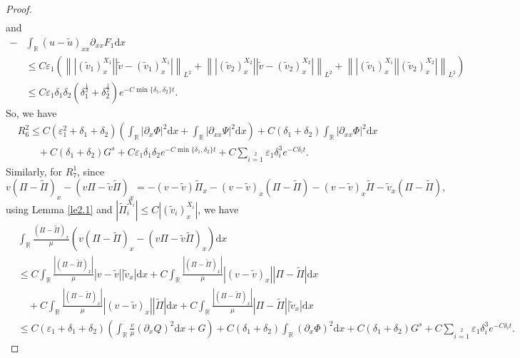\documentclass[10pt,reqno]{amsart}
\numberwithin{equation}{section}
\newcommand{\dif}{\mathrm{d}}
\begin{document}
\begin{proof}
\begin{align*}
\end{align*}
and
\begin{align*}
-&\int_{\mathbb{R}}(u-\widetilde{u})_{xx}\partial_{xx}F_1\dif x\\
&\le C\varepsilon_1 \left(\left\||(\widetilde{v}_1)^{X_1}_x||\widetilde{v}-(\widetilde{v}_1)^{X_1}_x|\right\|_{L^2}
+\left\||(\widetilde{v}_2)^{X_2}_x||\widetilde{v}-(\widetilde{v}_2)^{X_2}_x|\right\|_{L^2}
+\left\||(\widetilde{v}_1)^{X_1}_x||(\widetilde{v}_2)^{X_2}_x|\right\|_{L^2}\right)\\
&\le C\varepsilon_1\delta_1\delta_2(\delta_1^{\frac{1}{2}}+\delta_2^{\frac{1}{2}})
e^{-C\min\{\delta_1,\delta_2\}t}.
\end{align*}
So, we have
\begin{align*}
&R_6^2\le C(\varepsilon_1^2+\delta_1+\delta_2)\left(\int_\mathbb{R}|\partial_{x}\Phi|^2\dif x
+\int_\mathbb{R}|\partial_{xx}\Psi|^2\dif x\right)
  +C(\delta_1+\delta_2)\int_\mathbb{R}|\partial_{xx}\Phi|^2\dif x\\
   &\qquad+C(\delta_1+\delta_2)G^s
  +C\varepsilon_1\delta_1\delta_2e^{-C\min\{\delta_1,\delta_2\}t}+C\sum\limits_{i=1}\limits^2\varepsilon_1 \delta_i^3e^{-C\delta_i t}.
\end{align*}
Similarly, for $R_7^1$, since
\[
v(\Pi-\widetilde{\Pi})_{x}-(v\Pi-\widetilde{v}\widetilde{\Pi})_{x}=-(v-\widetilde{v})\widetilde{\Pi}_{x}
-(v-\widetilde{v})_{x}(\Pi-\widetilde{\Pi})
-(v-\widetilde{v})_{x}\widetilde{\Pi}-\widetilde{v}_{x}(\Pi-\widetilde{\Pi}),
\]
using Lemma \ref{le2.1} and $|\widetilde{\Pi}_i^{X_i}|\le C|(\widetilde{v}_i)^{X_i}_x|$, we have
\begin{align*}
 &\int_\mathbb{R}\frac{(\Pi-\widetilde{\Pi})_{x}}{\mu}
 \left(v(\Pi-\widetilde{\Pi})_{x}-(v\Pi-\widetilde{v}\widetilde{\Pi})_{x}\right)\dif x\\
 &\le C\int_\mathbb{R}\frac{|(\Pi-\widetilde{\Pi})_{x}|}{\mu}|v-\widetilde{v}||\widetilde{v}_{x}|\dif x
 + C\int_\mathbb{R}\frac{|(\Pi-\widetilde{\Pi})_{x}|}{\mu}|(v-\widetilde{v})_{x}||\Pi-\widetilde{\Pi}|\dif x\\
 &\quad+ C\int_\mathbb{R}\frac{|(\Pi-\widetilde{\Pi})_{x}|}{\mu}|(v-\widetilde{v})_{x}||\widetilde{\Pi}|\dif x
 + C\int_\mathbb{R}\frac{|(\Pi-\widetilde{\Pi})_{x}|}{\mu}|\Pi-\widetilde{\Pi}||\widetilde{v}_x|\dif x\\
 &\le C(\varepsilon_1+\delta_1+\delta_2)\left(\int_\mathbb{R}\frac{v}{\mu}(\partial_xQ)^2\dif x+G\right)
 +C(\delta_1+\delta_2)\int_\mathbb{R}(\partial_x\Phi)^2\dif x
 +C(\delta_1+\delta_2)G^s
 +C\sum\limits_{i=1}\limits^2\varepsilon_1 \delta_i^3e^{-C\delta_i t}.

\end{align*}
\end{proof}
\end{document}
